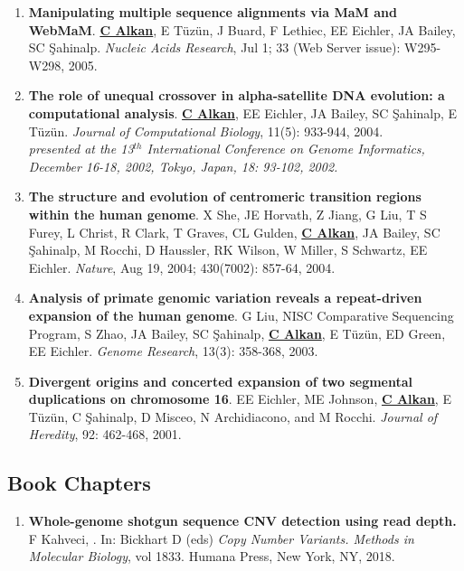 \begin{enumerate}
\item
{\bf Manipulating multiple sequence alignments via MaM and  WebMaM}.
{\bf {\underline{C Alkan}}}, E T\"{u}z\"{u}n, J Buard, F Lethiec,
EE Eichler, JA Bailey, SC \c{S}ahinalp.
{\em Nucleic Acids Research}, Jul 1;  33 (Web Server issue):
W295-W298, 2005.

\item
 {\bf The role of unequal crossover in alpha-satellite 
   DNA evolution: a computational analysis}.
  {\bf {\underline{C Alkan}}}, EE Eichler, JA Bailey, SC \c{S}ahinalp, E T\"{u}z\"{u}n.
  {\em Journal of Computational Biology}, 11(5): 933-944, 2004. \\
\hspace*{1cm}  {\footnotesize {\it presented at the 13$^{th}$ International Conference on Genome Informatics, 
December 16-18, 2002, Tokyo, Japan, 18: 93-102, 2002.}}

\item
  {\bf The structure and evolution of centromeric transition regions within
    the human genome}.
  X She, JE Horvath, Z Jiang, G Liu, T S Furey,
  L Christ, R Clark, T Graves, CL Gulden, {\bf \underline{C Alkan}}, JA Bailey, SC \c{S}ahinalp, 
  M Rocchi, D Haussler, RK Wilson, W Miller, S Schwartz, EE Eichler.
  {\em Nature}, Aug 19, 2004;  430(7002): 857-64, 2004.


\item
  {\bf Analysis of primate genomic variation reveals a repeat-driven 
    expansion of the human genome}.
  G Liu, NISC Comparative Sequencing Program, S Zhao, JA Bailey, 
  SC \c{S}ahinalp, {\bf \underline{C Alkan}}, E T\"{u}z\"{u}n, ED Green, EE Eichler.
  {\em Genome Research}, 13(3): 358-368, 2003.

\item
  {\bf Divergent origins and concerted expansion of two segmental
    duplications on 
    chromosome 16}.
  EE Eichler, ME Johnson, {\bf \underline{C Alkan}}, E T\"{u}z\"{u}n, C \c{S}ahinalp,
    D Misceo, 
    N Archidiacono, and M Rocchi.
    {\em Journal of Heredity}, 92: 462-468, 2001.

\end{enumerate}


\vspace{-.4cm}
\subsection{\small \sc  Book Chapters}
\begin{enumerate}
    \item 
       {\bf Whole-genome shotgun sequence CNV detection using read depth.}
       F Kahveci, \calkan{}.
       In: Bickhart D (eds) {\em Copy Number Variants. Methods in Molecular Biology}, vol 1833. Humana Press, New York, NY, 2018.
\end{enumerate}

